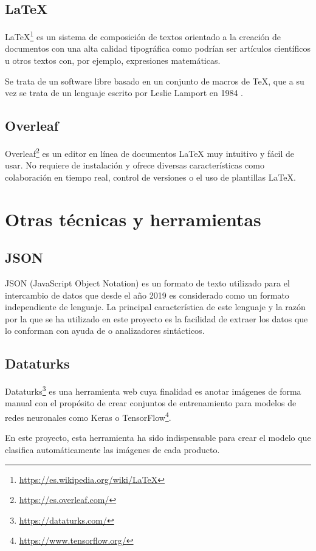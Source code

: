 \subsection{\LaTeX{}}
\LaTeX{}\footnote{\url{https://es.wikipedia.org/wiki/LaTeX}} es un sistema de composición de textos orientado a la creación de documentos con una alta calidad tipográfica como podrían ser artículos científicos u otros textos con, por ejemplo, expresiones matemáticas.

Se trata de un software libre basado en un conjunto de macros de \TeX, que a su vez se trata de un lenguaje escrito por Leslie Lamport en 1984 \cite{wiki:latex}.

\subsection{Overleaf}
Overleaf\footnote{\url{https://es.overleaf.com/}} es un editor en línea de documentos \LaTeX{} muy intuitivo y fácil de usar. No requiere de instalación y ofrece diversas características como colaboración en tiempo real, control de versiones o el uso de plantillas \LaTeX{}.

\section{Otras técnicas y herramientas}

\subsection{JSON}
JSON (JavaScript Object Notation) es un formato de texto utilizado para el intercambio de datos que desde el año 2019 es considerado como un formato independiente de lenguaje. La principal característica de este lenguaje y la razón por la que se ha utilizado en este proyecto es la facilidad de extraer los datos que lo conforman  con ayuda de  o analizadores sintácticos.

\subsection{Dataturks}
Dataturks\footnote{\url{https://dataturks.com/}} es una herramienta web cuya finalidad es anotar imágenes de forma manual con el propósito de crear conjuntos de entrenamiento para modelos de redes neuronales como Keras o TensorFlow\footnote{\url{https://www.tensorflow.org/}}.

En este proyecto, esta herramienta ha sido indispensable para crear el modelo que clasifica automáticamente las imágenes de cada producto.
















